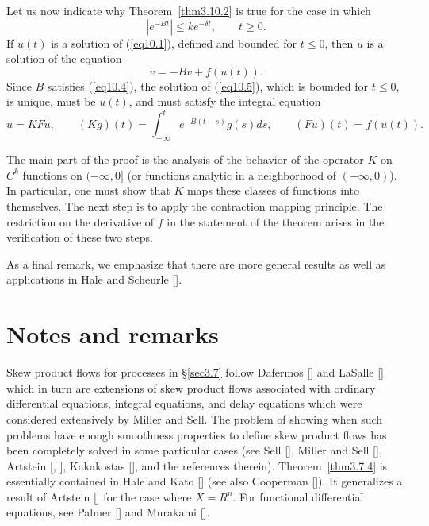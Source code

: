 \documentclass{surv-l}
\makeatletter
\theoremstyle{plain}
\theoremstyle{definition}
\numberwithin{equation}{section}
\numberwithin{figure}{chapter}
\newcommand\addtocline[2]{\let\@secnumber\@empty\@tocwrite{#1}{#2}}
\makeatother
\begin{document}
Let us now indicate why Theorem~\ref{thm3.10.2} is true for the case in which
\begin{equation}\label{eq10.4}
|e^{-Bt}|\leq ke^{-\delta t},\qquad t\geq 0.
\end{equation}
If $u(t)$ is a solution of (\ref{eq10.1}), defined and bounded for $t\leq 0$, then $u$ is a solution of the equation
\begin{equation}\label{eq10.5}
\dot{v}=-Bv+f(u(t)).
\end{equation}
Since $B$ satisfies (\ref{eq10.4}), the solution of (\ref{eq10.5}), which is bounded for $t\leq 0$, is unique, must be $u(t)$, and must satisfy the integral equation
\begin{equation}\label{eq10.6}
u=KFu,\qquad (Kg)(t)=\int_{-\infty}^{t}e^{-B(t-s)}g(s)ds,\qquad (Fu)(t)=f(u(t)).
\end{equation}

The main part of the proof is the analysis of the behavior of the operator $K$ on $C^{k}$ functions on $(-\infty,0]$ (or functions analytic in a neighborhood of $(-\infty,0)$). In particular, one must show that $K$ maps these classes of functions into themselves. The next step is to apply the contraction mapping principle. The restriction on the derivative of $f$ in the statement of the theorem arises in the verification of these two steps.

As a final remark, we emphasize that there are more general results as well as applications in Hale and Scheurle [\citeyear{1985hs}].

\skiptoctrue
\section*{Notes and remarks}
\addtocline{section}{Notes and Remarks}

Skew product flows for processes in \S\ref{sec3.7} follow Dafermos [\citeyear{1975d}] and LaSalle [\citeyear{1976la}] which in turn are extensions of skew product flows associated with ordinary differential equations, integral equations, and delay equations which were considered extensively by Miller and Sell. The problem of showing when such problems have enough smoothness properties to define skew product flows has been completely solved in some particular cases (see Sell [\citeyear{1971se}], Miller and Sell [\citeyear{1976ms}], Artstein [\citeyear{1977aa}, \citeyear{1977ba}], Kakakostas [\citeyear{1982k}], and the references therein). Theorem~\ref{thm3.7.4} is essentially contained in Hale and Kato [\citeyear{1978hk}] (see also Cooperman [\citeyear{1978c}]). It generalizes a result of Artstein [\citeyear{1978a}] for the case where $X=R^{n}$. For functional differential equations, see Palmer [\citeyear{1978p}] and Murakami [\citeyear{1985m}].
\end{document}

